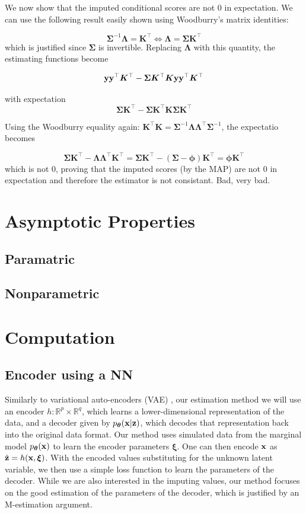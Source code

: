 \documentclass[twoside,11pt]{article}
\begin{document}
We now show that the imputed conditional scores are not 0 in expectation. We can use the following result easily shown using Woodburry's matrix identities:

$$
\bm \Sigma^{-1} \bm\Lambda = \bm K^\top \Leftrightarrow \bm\Lambda = \bm \Sigma \bm K^\top
$$
which is justified since $\bm\Sigma$ is invertible. Replacing $\bm\Lambda$ with this quantity, the estimating functions become

$$
 {\bf y}{\bf y}^\top \bm K^\top  - \bm \Sigma \bm K^\top \bm K {\bf y} {\bf y}^\top \bm K^\top 
 $$

 with expectation
$$
 \bm\Sigma \bm K^\top  - \bm \Sigma \bm K^\top \bm K \bm\Sigma \bm K^\top 
 $$

Using the Woodburry equality again: $\bm K^\top \bm K = \bm\Sigma^{-1} \bm\Lambda\bm\Lambda^\top \bm\Sigma^{-1}$, the expectatio becomes

$$
\bm\Sigma \bm K^\top - \bm\Lambda\bm\Lambda^\top \bm K^\top = \bm\Sigma \bm K^\top - (\bm\Sigma - \bm\phi) \bm K^\top = \bm\phi\bm K^\top
$$
which is not $0$, proving that the imputed scores (by the MAP) are not 0 in expectation and therefore the estimator is not consistant. Bad, very bad.
\section{Asymptotic Properties}
\subsection{Paramatric}
\subsection{Nonparametric}
\section{Computation}
\subsection{Encoder using a NN}


Similarly to variational auto-encoders (VAE) \cite{kingma2014autoencoding}, our estimation method we will use an encoder $h: \mathbb R^p \times \mathbb R^q$, which learns a lower-dimensional representation of the data, and a decoder given by $p_{\bm{\theta}}({\bf x}|{\bf z})$, which decodes that representation back into the original data format. Our method uses simulated data from the marginal model $p_{\bm{\theta}}({\bf x})$ to learn the encoder parameters $\bm\xi$. One can then encode ${\bf x}$ as $\hat{{\bf z}} = h({\bf x}, \bm\xi)$. With the encoded values substituting for the unknown latent variable, we then use a simple loss function to learn the parameters of the decoder. While we are also interested in the imputing values, our method focuses on the good estimation of the parameters of the decoder, which is justified by an M-estimation argument. 
\end{document}
